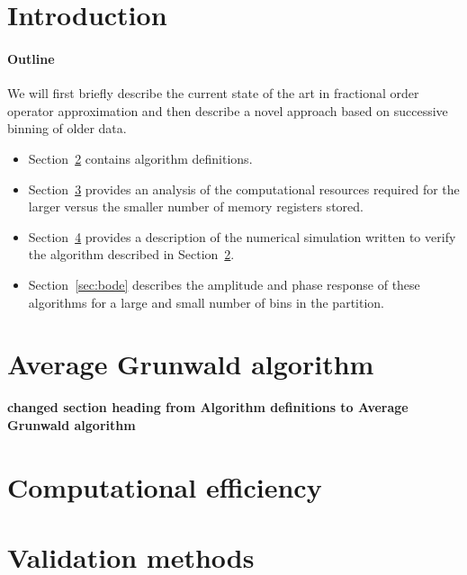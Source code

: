 \documentclass[preprint,12pt]{elsarticle}
\begin{document}

\section{Introduction}\label{sec:intro}
\setcounter{section}{1}
\setcounter{equation}{0}



\paragraph{Outline\\}
We will first briefly describe the current state of the art in
fractional order operator approximation and then describe a novel
approach based on successive binning of older data.

\begin{itemize} 
\item Section~\ref{sec:algorithmDefn} contains algorithm definitions. 
\item  Section~\ref{sec:computation} provides an analysis of the
  computational resources required for the larger versus the smaller
  number of memory registers stored.
\item Section~\ref{sec:methods} provides a description of the
  numerical simulation written to verify the algorithm described in
  Section~\ref{sec:algorithmDefn}.
\item Section~\ref{sec:bode} describes the amplitude and phase response
  of these algorithms for a large and small number of bins in the
  partition.
\end{itemize}


\section{Average Grunwald algorithm}\label{sec:algorithmDefn}
{\bf changed section heading from Algorithm definitions to Average Grunwald algorithm}



\section{Computational efficiency}\label{sec:computation}



\section{Validation methods}\label{sec:methods}

\end{document}
